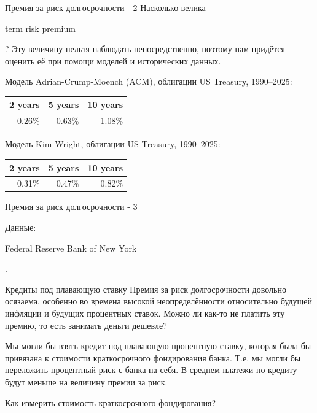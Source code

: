 \documentclass{beamer}
\newcommand{\en}[1]{\begin{otherlanguage}{english}#1\end{otherlanguage}}
\begin{document}
\begin{frame}{Премия за риск долгосрочности - 2}
\justify
Насколько велика \en{term risk premium}? Эту величину нельзя наблюдать непосредственно, поэтому нам придётся оценить её при помощи моделей и исторических данных.

\justify
Модель Adrian-Crump-Moench (ACM), облигации US Treasury, 1990--2025:

\begin{tabular}{r|r|r}
2 years & 5 years & 10 years \\ \hline
0.26\% & 0.63\% & 1.08\% 
\end{tabular}

\justify
Модель Kim-Wright, облигации US Treasury, 1990--2025:

\begin{tabular}{r|r|r}
2 years & 5 years & 10 years \\ \hline
0.31\% & 0.47\% & 0.82\%
\end{tabular}

\end{frame}



\begin{frame}{Премия за риск долгосрочности - 3}
\center
{}

\scriptsize Данные: \en{Federal Reserve Bank of New York}.
\end{frame}



\begin{frame}{Кредиты под плавающую ставку}
\justify
Премия за риск долгосрочности довольно осязаема, особенно во времена высокой неопределённости относительно будущей инфляции и будущих процентных ставок. Можно ли как-то не платить эту премию, то есть занимать деньги дешевле?

\justify
Мы могли бы взять кредит под плавающую процентную ставку, которая была бы привязана к стоимости краткосрочного фондирования банка. Т.е. мы могли бы переложить процентный риск с банка на себя. В среднем платежи по кредиту будут меньше на величину премии за риск.

\justify
Как измерить стоимость краткосрочного фондирования?
\end{frame}
\end{document}
